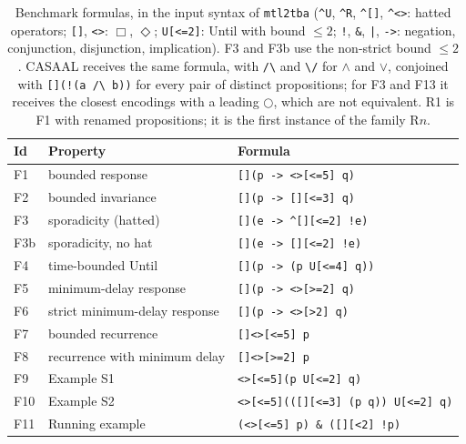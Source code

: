 \begin{table}[t]
\centering
\caption{Benchmark formulas, in the input syntax of \texttt{mtl2tba} (\texttt{\^{}U}, \texttt{\^{}R}, \texttt{\^{}[]}, \texttt{\^{}<>}: hatted operators; \texttt{[]}, \texttt{<>}: $\Box$, $\Diamond$; \texttt{U[<=2]}: Until with bound $\le2$; \texttt{!}, \texttt{\&}, \texttt{|}, \texttt{->}: negation, conjunction, disjunction, implication).  F3 and F3b use the non-strict bound $\le2$.  CASAAL receives the same formula, with \texttt{/\textbackslash} and \texttt{\textbackslash/} for $\wedge$ and $\vee$, conjoined with \texttt{[](!(a /\textbackslash{} b))} for every pair of distinct propositions; for F3 and F13 it receives the closest encodings with a leading $\bigcirc$, which are not equivalent.  R1 is F1 with renamed propositions; it is the first instance of the family R$n$.}
\label{tab:formulas}
\small
\begin{tabular}{@{}llp{}@{}}
\toprule
Id & Property & Formula\\
\midrule
F1 & bounded response & \texttt{[](p -\textgreater{} \textless{}\textgreater{}[\textless{}=5] q)}\\
F2 & bounded invariance & \texttt{[](p -\textgreater{} [][\textless{}=3] q)}\\
F3 & sporadicity (hatted) & \texttt{[](e -\textgreater{} \^{}[][\textless{}=2] !e)}\\
F3b & sporadicity, no hat & \texttt{[](e -\textgreater{} [][\textless{}=2] !e)}\\
F4 & time-bounded Until & \texttt{[](p -\textgreater{} (p U[\textless{}=4] q))}\\
F5 & minimum-delay response & \texttt{[](p -\textgreater{} \textless{}\textgreater{}[\textgreater{}=2] q)}\\
F6 & strict minimum-delay response & \texttt{[](p -\textgreater{} \textless{}\textgreater{}[\textgreater{}2] q)}\\
F7 & bounded recurrence & \texttt{[]\textless{}\textgreater{}[\textless{}=5] p}\\
F8 & recurrence with minimum delay & \texttt{[]\textless{}\textgreater{}[\textgreater{}=2] p}\\
F9 & Example S1 & \texttt{\textless{}\textgreater{}[\textless{}=5](p U[\textless{}=2] q)}\\
F10 & Example S2 & \texttt{\textless{}\textgreater{}[\textless{}=5](([][\textless{}=3] (p \textbar{} q)) U[\textless{}=2] q)}\\
F11 & Running example & \texttt{(\textless{}\textgreater{}[\textless{}=5] p) \& ([][\textless{}2] !p)}\\

\end{tabular}
\end{table}
